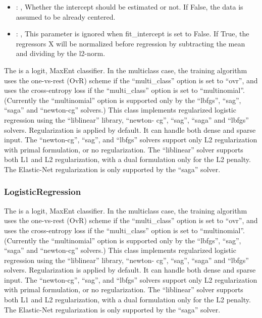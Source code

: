 \begin{itemize}
    \item {}: , 
      Whether the intercept should be estimated or not. If False,
      the data is assumed to be already centered.

    \item {}: , 
      This parameter is ignored when fit\_intercept is set to False. If True,
      the regressors X will be normalized before regression by subtracting the mean and
      dividing by the l2-norm.
  \end{itemize}
 The   is                             a logit, MaxEnt classifier.
 In the multiclass case, the training algorithm uses the one-vs-rest (OvR) scheme
 if the ``multi_class'' option is set to ``ovr'', and uses the cross-entropy loss if the
 ``multi_class'' option is set to ``multinomial''. (Currently the ``multinomial'' option
 is supported only by the ``lbfgs'', ``sag'', ``saga'' and ``newton-cg'' solvers.)
 This class implements regularized logistic regression using the ``liblinear'' library, ``newton-
 cg'',                             ``sag'', ``saga'' and ``lbfgs'' solvers. Regularization is
 applied by default. It can handle both dense and sparse input.                             The
 ``newton-cg'', ``sag'', and ``lbfgs'' solvers support only L2 regularization with primal
 formulation,                             or no regularization. The ``liblinear'' solver supports
 both L1 and L2 regularization, with a dual formulation                             only for the L2
 penalty. The Elastic-Net regularization is only supported by the ``saga'' solver.

\subsubsection{LogisticRegression}
  The   is                             a logit, MaxEnt classifier.
  In the multiclass case, the training algorithm uses the one-vs-rest (OvR) scheme
  if the ``multi\_class'' option is set to ``ovr'', and uses the cross-entropy loss if the
  ``multi\_class'' option is set to ``multinomial''. (Currently the ``multinomial'' option
  is supported only by the ``lbfgs'', ``sag'', ``saga'' and ``newton-cg'' solvers.)
  This class implements regularized logistic regression using the ``liblinear'' library, ``newton-
  cg'',                             ``sag'', ``saga'' and ``lbfgs'' solvers. Regularization is
  applied by default. It can handle both dense and sparse input.                             The
  ``newton-cg'', ``sag'', and ``lbfgs'' solvers support only L2 regularization with primal
  formulation,                             or no regularization. The ``liblinear'' solver supports
  both L1 and L2 regularization, with a dual formulation                             only for the L2
  penalty. The Elastic-Net regularization is only supported by the ``saga'' solver.

